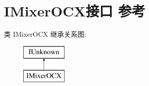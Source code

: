 \hypertarget{interface_i_mixer_o_c_x}{}\section{I\+Mixer\+O\+C\+X接口 参考}
\label{interface_i_mixer_o_c_x}
类 I\+Mixer\+O\+CX 继承关系图\+:\begin{figure}[H]
\begin{center}
\leavevmode
\includegraphics[height=2.000000cm]{interface_i_mixer_o_c_x}
\end{center}
\end{figure}
